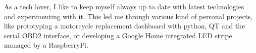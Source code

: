 
\begin{cventries}
  \cventry
    {}
    {}
    {}
    {}
    {As a tech lover, I like to keep myself always up to date with latest technologies and experimenting with it. This led me through various kind of personal projects, like prototyping a motorcycle replacement dashboard with python, QT and the serial OBD2 interface, or developing a Google Home integrated LED stripe managed by a RaspberryPi.}

\end{cventries}
